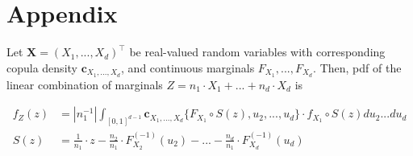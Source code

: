 \newpage
\section{Appendix}\label{sec:appendix}

\begin{proposition}
   Let $\bm{X} = (X_1, ..., X_d)^\top$ be real-valued random variables with corresponding
   copula density $\bm{c}_{X_1, ..., X_d}$, and continuous marginals $F_{X_1}, ..., F_{X_d}$.
   Then,
   pdf of the linear combination of marginals $Z = n_1 \cdot X_1 + ... +  n_d \cdot X_d $ is

   \begin{align}
   f_Z(z) &= \left| n_1^{-1} \right| \int_{[0,1]^{d-1}} \bm{c}_{X_1,...,X_d}
      \{F_{X_1} \circ S(z), u_2, ..., u_d \} \cdot
      f_{X_1} \circ S(z) du_2 ... du_d \label{density} \\
      S(z) &= \frac{1}{n_1}\cdot z - \frac{n_2}{n_1} \cdot F^{(-1)}_{X_2}(u_2) - ... -  \frac{n_d}{n_1} \cdot F^{(-1)}_{X_d}(u_d)
      \end{align}
   \end{proposition}


